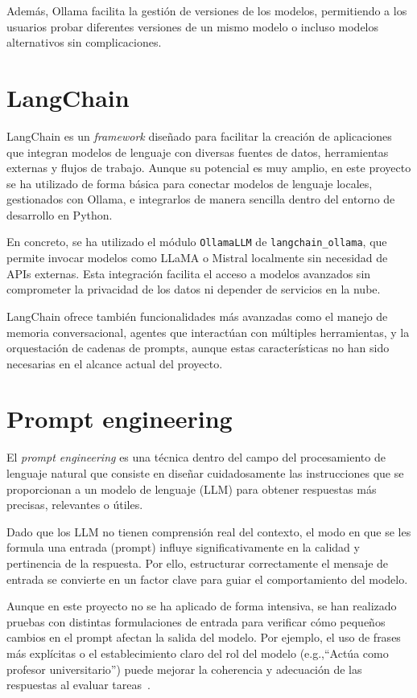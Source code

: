 Además, Ollama facilita la gestión de versiones de los modelos, permitiendo a los usuarios
probar diferentes versiones de un mismo modelo o incluso modelos alternativos sin complicaciones.


\section{LangChain}

LangChain es un \textit{framework} diseñado para facilitar la creación de aplicaciones 
que integran modelos de lenguaje con diversas fuentes de datos, herramientas externas 
y flujos de trabajo. Aunque su potencial es muy amplio, en este proyecto se ha 
utilizado de forma básica para conectar modelos de lenguaje locales, 
gestionados con Ollama, e integrarlos de manera sencilla dentro del entorno de desarrollo 
en Python.

En concreto, se ha utilizado el módulo \texttt{OllamaLLM} de \texttt{langchain\_ollama}, 
que permite invocar modelos como LLaMA o Mistral localmente sin necesidad de APIs externas. 
Esta integración facilita el acceso a modelos avanzados sin comprometer la privacidad de 
los datos ni depender de servicios en la nube.

LangChain ofrece también funcionalidades más avanzadas como el manejo de memoria conversacional, 
agentes que interactúan con múltiples herramientas, y la orquestación de cadenas de prompts, 
aunque estas características no han sido necesarias en el alcance actual del proyecto.

\section{Prompt engineering}

El \textit{prompt engineering} es una técnica dentro del campo del procesamiento de lenguaje natural
que consiste en diseñar cuidadosamente las instrucciones que se proporcionan a un modelo de 
lenguaje (LLM) para obtener respuestas más precisas, relevantes o útiles.

Dado que los LLM no tienen comprensión real del contexto, el modo en que se les formula una 
entrada (prompt) influye significativamente en la calidad y pertinencia de la respuesta. 
Por ello, estructurar correctamente el mensaje de entrada se convierte en un factor clave 
para guiar el comportamiento del modelo.

Aunque en este proyecto no se ha aplicado de forma intensiva, se han realizado pruebas con distintas 
formulaciones de entrada para verificar cómo pequeños cambios en el prompt afectan la salida del 
modelo. Por ejemplo, el uso de frases más explícitas o el establecimiento claro del rol del modelo 
(e.g.,``Actúa como profesor universitario'') puede mejorar la coherencia y adecuación de las 
respuestas al evaluar tareas~\cite{web:promptingguide}.

